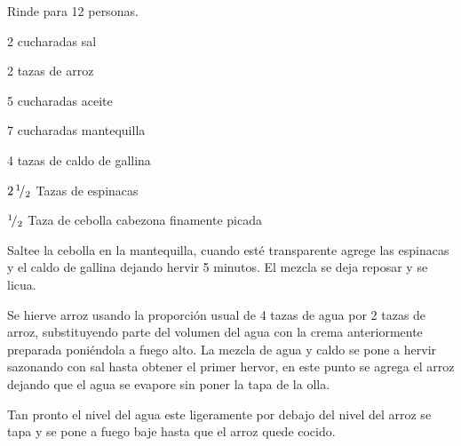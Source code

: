 
Rinde para 12 personas.


\begin{ingredientes}
\item 2 cucharadas sal
\item 2 tazas de arroz
\item 5 cucharadas aceite
\item 7 cucharadas mantequilla
\item 4 tazas de caldo de gallina
\item $2\,{}^{1}\!/_{2}$ Tazas de espinacas
\item ${}^{1}\!/_{2}$ Taza de cebolla cabezona finamente picada
\end{ingredientes}
\preparacion
Saltee la cebolla en la mantequilla, cuando esté transparente agrege las espinacas y el caldo de gallina dejando hervir 5 minutos. El mezcla se deja reposar y se licua. 

Se hierve arroz usando la proporción usual de 4 tazas de agua por 2 tazas de arroz, substituyendo parte del volumen del agua con la crema anteriormente preparada poniéndola a fuego alto. La mezcla de agua y caldo se pone a hervir sazonando con sal hasta obtener el primer hervor, en este punto se agrega el arroz dejando que el agua se evapore sin poner la tapa de la olla. 

Tan pronto el nivel del agua este ligeramente por debajo del nivel del arroz se tapa y se pone a fuego baje hasta que el arroz quede cocido.


